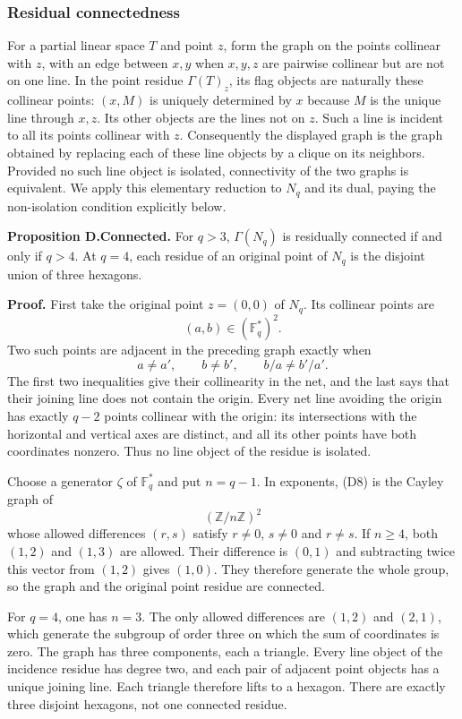 \subsubsection{Residual connectedness}\label{residual-connectedness}

For a partial linear space \(T\) and point \(z\), form the graph on the
points collinear with \(z\), with an edge between \(x,y\) when \(x,y,z\)
are pairwise collinear but are not on one line. In the point residue
\(\Gamma(T)_z\), its flag objects are naturally these collinear points:
\((x,M)\) is uniquely determined by \(x\) because \(M\) is the unique
line through \(x,z\). Its other objects are the lines not on \(z\). Such
a line is incident to all its points collinear with \(z\). Consequently
the displayed graph is the graph obtained by replacing each of these
line objects by a clique on its neighbors. Provided no such line object
is isolated, connectivity of the two graphs is equivalent. We apply this
elementary reduction to \(N_q\) and its dual, paying the non-isolation
condition explicitly below.

\textbf{Proposition D.Connected.} For \(q>3\), \(\Gamma(N_q)\) is
residually connected if and only if \(q>4\). At \(q=4\), each residue of
an original point of \(N_q\) is the disjoint union of three hexagons.

\textbf{Proof.} First take the original point \(z=(0,0)\) of \(N_q\).
Its collinear points are \[
(a,b)\in(\mathbb F_q^*)^2.
\] Two such points are adjacent in the preceding graph exactly when \[
a\ne a',\qquad b\ne b',\qquad b/a\ne b'/a'.
\tag{D8}
\] The first two inequalities give their collinearity in the net, and
the last says that their joining line does not contain the origin. Every
net line avoiding the origin has exactly \(q-2\) points collinear with
the origin: its intersections with the horizontal and vertical axes are
distinct, and all its other points have both coordinates nonzero. Thus
no line object of the residue is isolated.

Choose a generator \(\zeta\) of \(\mathbb F_q^*\) and put \(n=q-1\). In
exponents, (D8) is the Cayley graph of \[
(\mathbb Z/n\mathbb Z)^2
\] whose allowed differences \((r,s)\) satisfy \(r\ne0\), \(s\ne0\) and
\(r\ne s\). If \(n\ge4\), both \((1,2)\) and \((1,3)\) are allowed.
Their difference is \((0,1)\) and subtracting twice this vector from
\((1,2)\) gives \((1,0)\). They therefore generate the whole group, so
the graph and the original point residue are connected.

For \(q=4\), one has \(n=3\). The only allowed differences are \((1,2)\)
and \((2,1)\), which generate the subgroup of order three on which the
sum of coordinates is zero. The graph has three components, each a
triangle. Every line object of the incidence residue has degree two, and
each pair of adjacent point objects has a unique joining line. Each
triangle therefore lifts to a hexagon. There are exactly three disjoint
hexagons, not one connected residue.


